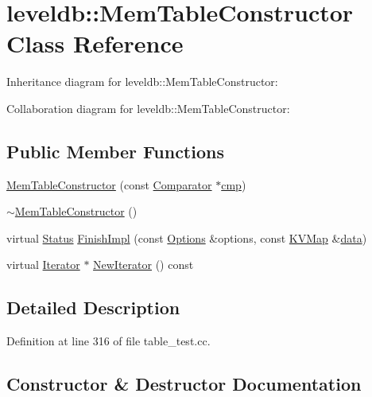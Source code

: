 \hypertarget{classleveldb_1_1_mem_table_constructor}{}\section{leveldb\+:\+:Mem\+Table\+Constructor Class Reference}
\label{classleveldb_1_1_mem_table_constructor}


Inheritance diagram for leveldb\+:\+:Mem\+Table\+Constructor\+:


Collaboration diagram for leveldb\+:\+:Mem\+Table\+Constructor\+:
\subsection*{Public Member Functions}
\begin{DoxyCompactItemize}
\item 
\hyperlink{classleveldb_1_1_mem_table_constructor_a5f4c341eb97e6e3938ec05b98455664a}{Mem\+Table\+Constructor} (const \hyperlink{structleveldb_1_1_comparator}{Comparator} $\ast$\hyperlink{table__test_8cc_a87863e435922f0910ca8db43f02a6c0b}{cmp})
\item 
\hyperlink{classleveldb_1_1_mem_table_constructor_a893a3f902a8dbbe7c2548c3ab46512c1}{$\sim$\+Mem\+Table\+Constructor} ()
\item 
virtual \hyperlink{classleveldb_1_1_status}{Status} \hyperlink{classleveldb_1_1_mem_table_constructor_a78851e48bd187f231934e128ab050624}{Finish\+Impl} (const \hyperlink{structleveldb_1_1_options}{Options} \&options, const \hyperlink{namespaceleveldb_aac1e50450147be263e08252c6700f7a7}{K\+V\+Map} \&\hyperlink{classleveldb_1_1_constructor_a55a0363200d6e86d8beb3b15b75e3824}{data})
\item 
virtual \hyperlink{classleveldb_1_1_iterator}{Iterator} $\ast$ \hyperlink{classleveldb_1_1_mem_table_constructor_ae6eca097713c07eed6f630cca780fedd}{New\+Iterator} () const 
\end{DoxyCompactItemize}


\subsection{Detailed Description}


Definition at line 316 of file table\+\_\+test.\+cc.



\subsection{Constructor \& Destructor Documentation}
\hypertarget{classleveldb_1_1_mem_table_constructor_a5f4c341eb97e6e3938ec05b98455664a}{}
